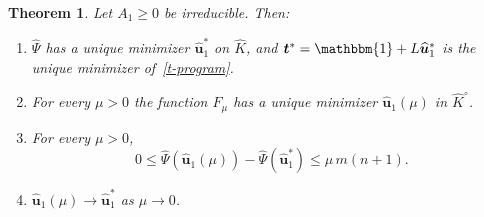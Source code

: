 \documentclass[11pt]{article}
\theoremstyle{plain}
\newtheorem{theorem}{Theorem}[section]
\theoremstyle{definition}
\theoremstyle{remark}
\renewcommand{\labelenumi}{\textbf{\arabic{enumi}.}}
\numberwithin{equation}{section}
\numberwithin{figure}{section}
\numberwithin{table}{section}
\begin{document}
\begin{theorem}\label{barrier}
Let $A_1\ge 0$ be irreducible. Then:
\begin{enumerate}
\renewcommand{\labelenumi}{(\roman{enumi})}
\item $\widehat\Psi$ has a unique minimizer $\widehat{\bm u}_1^*$ on $\widehat K$, and
$\bm t^*=\mathbbm{1}+L\widehat{\bm u}_1^*$ is the unique minimizer
of~\eqref{t-program}.
\item For every $\mu>0$ the function $F_\mu$ has a unique minimizer
$\widehat{\bm u}_1(\mu)$ in $\widehat K^\circ$.
\item For every $\mu>0$,
\begin{equation}\label{gap}
0\le\widehat\Psi\left(\widehat{\bm u}_1(\mu)\right)-\widehat\Psi\left(\widehat{\bm u}_1^*\right)\le\mu\,m(n+1).
\end{equation}
\item $\widehat{\bm u}_1(\mu)\to\widehat{\bm u}_1^*$ as $\mu\to 0$.
\end{enumerate}
\end{theorem}
\end{document}
